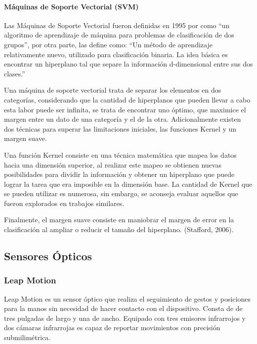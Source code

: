 \paragraph{Máquinas de Soporte Vectorial (SVM)}
Las Máquinas de Soporte Vectorial fueron definidas en 1995 por \parencite{Cortes1995Support-VectorNetworks} como “un algoritmo de aprendizaje de máquina para problemas de clasificación de dos grupos”, por otra parte, \parencite{Boswell2002IntroductionMachines} las define como: “Un método de aprendizaje relativamente nuevo, utilizado para clasificación binaria. La idea básica es encontrar un hiperplano tal que separe la información d-dimensional entre sus dos clases.”

Una máquina de soporte vectorial trata de separar los elementos en dos categorías, considerando que la cantidad de hiperplanos que pueden llevar a cabo esta labor puede ser infinita, se trata de encontrar uno óptimo, que maximice el margen entre un dato de una categoría y el de la otra. Adicionalmente existen dos técnicas para superar las limitaciones iniciales, las funciones Kernel y un margen suave.

Una función Kernel consiste en una técnica matemática que mapea los datos hacia una dimensión superior, al realizar este mapeo se obtienen nuevas posibilidades para dividir la información y obtener un hiperplano que puede lograr la tarea que era imposible en la dimensión base. La cantidad de Kernel que se pueden utilizar es numerosa, sin embargo, se aconseja evaluar aquellos que fueron explorados en trabajos similares. \parencite{Boswell2002IntroductionMachines}

Finalmente, el margen suave consiste en maniobrar el margen de error en la clasificación al ampliar o reducir el tamaño del hiperplano. (Stafford, 2006).


\subsection{Sensores Ópticos}
\subsubsection{Leap Motion}
Leap Motion es un sensor óptico que realiza el seguimiento de gestos y posiciones para la manos sin necesidad de hacer contacto con el dispositivo. Consta de de tres pulgadas de largo y una de ancho. Equipado con tres emisores infrarrojos y dos cámaras infrarrojas es capaz de reportar movimientos con precisión submilimétrica.  \parencite{Weichert2013AnalysisController.}

